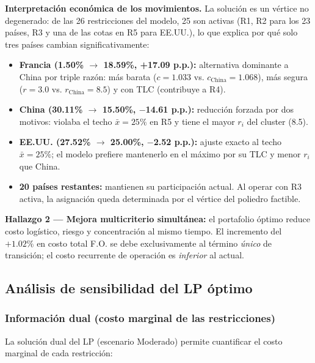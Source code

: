 \documentclass[11pt,a4paper]{article}
\begin{document}
\vspace{-0.3cm}
\textbf{Interpretación económica de los movimientos.} La solución es un vértice no degenerado: de las 26 restricciones del modelo, 25 son activas (R1, R2 para los 23 países, R3 y una de las cotas en R5 para EE.UU.), lo que explica por qué solo tres países cambian significativamente:
\vspace{-0.1cm}
\begin{itemize}[noitemsep,topsep=0pt,leftmargin=1.3em]
\footnotesize
\item \textbf{Francia (1.50\% $\to$ 18.59\%, +17.09 p.p.):} alternativa dominante a China por triple razón: más barata ($c=1.033$ vs. $c_{\text{China}}=1.068$), más segura ($r=3.0$ vs. $r_{\text{China}}=8.5$) y con TLC (contribuye a R4).
\item \textbf{China (30.11\% $\to$ 15.50\%, $-$14.61 p.p.):} reducción forzada por dos motivos: violaba el techo $\bar{x}=25\%$ en R5 y tiene el mayor $r_i$ del cluster (8.5).
\item \textbf{EE.UU. (27.52\% $\to$ 25.00\%, $-$2.52 p.p.):} ajuste exacto al techo $\bar{x}=25\%$; el modelo prefiere mantenerlo en el máximo por su TLC y menor $r_i$ que China.
\item \textbf{20 países restantes:} mantienen su participación actual. Al operar con R3 activa, la asignación queda determinada por el vértice del poliedro factible.
\end{itemize}

\begin{hallazgo}
\textbf{Hallazgo 2 --- Mejora multicriterio simultánea:} el portafolio óptimo reduce costo logístico, riesgo y concentración al mismo tiempo. El incremento del $+1.02\%$ en costo total F.O. se debe exclusivamente al término \emph{único} de transición; el costo recurrente de operación es \emph{inferior} al actual.
\end{hallazgo}

\subsection{Análisis de sensibilidad del LP óptimo}

\subsubsection{Información dual (costo marginal de las restricciones)}

La solución dual del LP (escenario Moderado) permite cuantificar el costo marginal de cada restricción:
\end{document}
